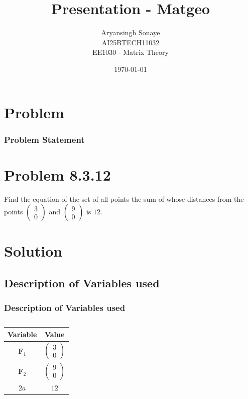 \documentclass{beamer}
\title{Presentation - Matgeo}
\author{Aryansingh Sonaye \\
AI25BTECH11032 \\
EE1030 - Matrix Theory}
\date{\today}
\theoremstyle{remark}
\newcommand{\myvec}[1]{\ensuremath{\begin{pmatrix}#1\end{pmatrix}}}
\let\vec\mathbf
\numberwithin{equation}{section}
\begin{document}
\begin{frame}
\titlepage
\end{frame}

\section{Problem}
\begin{frame}
\frametitle{Problem Statement}
\section*{Problem 8.3.12}
Find the equation of the set of all points the sum of whose distances 
from the points $\myvec{3\\0}$ and $\myvec{9\\0}$ is $12$.


\end{frame}

\section{Solution}
\subsection{Description of Variables used}
\begin{frame}
\frametitle{Description of Variables used}
\begin{table}[H]
\centering
\begin{tabular}{|c|c|}
\hline
Variable & Value \\
\hline
$\vec F_1$ & $\myvec{3\\0}$ \\
\hline
$\vec F_2$ & $\myvec{9\\0}$ \\
\hline
$2a$ & $12$ \\
\hline
\end{tabular}
\caption{} \label{}
\end{table}


\end{frame}
\end{document}
